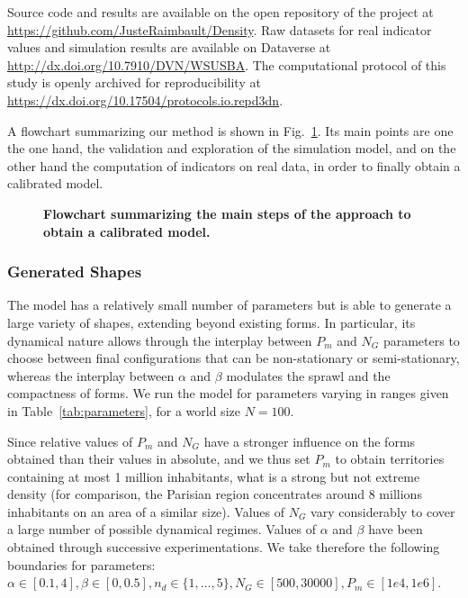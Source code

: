 \documentclass[10pt,letterpaper]{article}
\begin{document}
Source code and results are available on the open repository of the project at \url{https://github.com/JusteRaimbault/Density}. Raw datasets for real indicator values and simulation results are available on Dataverse at \url{http://dx.doi.org/10.7910/DVN/WSUSBA}. The computational protocol of this study is openly archived for reproducibility at \url{https://dx.doi.org/10.17504/protocols.io.repd3dn}.

A flowchart summarizing our method is shown in Fig.~\ref{fig:fig2}. Its main points are one the one hand, the validation and exploration of the simulation model, and on the other hand the computation of indicators on real data, in order to finally obtain a calibrated model.



\begin{figure}[!h]
	\caption{\textbf{Flowchart summarizing the main steps of the approach to obtain a calibrated model.}}
	\label{fig:fig2}
\end{figure}



\subsubsection*{Generated Shapes}

The model has a relatively small number of parameters but is able to generate a large variety of shapes, extending beyond existing forms. In particular, its dynamical nature allows through the interplay between $P_m$ and $N_G$ parameters to choose between final configurations that can be non-stationary or semi-stationary, whereas the interplay between $\alpha$ and $\beta$ modulates the sprawl and the compactness of forms. We run the model for parameters varying in ranges given in Table~\ref{tab:parameters}, for a world size $N=100$.

Since relative values of $P_m$ and $N_G$ have a stronger influence on the forms obtained than their values in absolute, and we thus set $P_m$ to obtain territories containing at most 1 million inhabitants, what is a strong but not extreme density (for comparison, the Parisian region concentrates around 8 millions inhabitants on an area of a similar size). Values of $N_G$ vary considerably to cover a large number of possible dynamical regimes. Values of $\alpha$ and $\beta$ have been obtained through successive experimentations. We take therefore the following boundaries for parameters: $\alpha \in [0.1,4],\beta \in [0,0.5],n_d \in \{1,\ldots , 5\}, N_G \in [500,30000], P_m \in [1e4,1e6]$.
\end{document}
